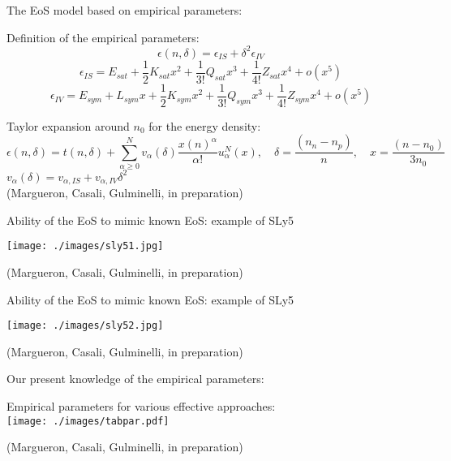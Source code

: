 \documentclass[francais]{beamer}
\begin{document}
\begin{frame}{The EoS model based on empirical parameters:} 
	\begin{block}{Definition of the empirical parameters:}
	\begin{equation}
\epsilon(n,\delta)=\epsilon_{IS}+\delta^2 \epsilon_{IV}
	\end{equation}
	\begin{equation}
	\epsilon_{IS} = E_{sat}+\dfrac{1}{2}K_{sat}x^2 + \dfrac{1}{3!}Q_{sat}x^3+\dfrac{1}{4!}Z_{sat}x^4+o(x^5)
	\end{equation}
	\begin{equation}
	\epsilon_{IV} = E_{sym}+L_{sym}x + \dfrac{1}{2}K_{sym}x^2 + \dfrac{1}{3!}Q_{sym}x^3+\dfrac{1}{4!}Z_{sym}x^4+o(x^5)
	\end{equation}
	\end{block}
	
	\begin{block}{Taylor expansion around $n_0$ for the energy density:}
	\vspace{-0.3cm}
			$$\epsilon(n,\delta)=t(n,											\delta)+\sum^{N}_{\alpha\geq0}v_{\alpha}								(\delta)\frac{x(n)^{\alpha}}{\alpha!}u^N_{\alpha}(x) ,
			 \quad \delta  = \dfrac{(n_n-n_p)}{n},\quad x=\dfrac{(n-n_0)}{3n_0}$$
$v_\alpha(\delta) = v_{\alpha,IS} + v_{\alpha,IV}\delta^2$\\
{\scriptsize (Margueron, Casali, Gulminelli, in preparation)}
	\end{block}
\end{frame}	
	

\begin{frame}{Ability of the EoS to mimic known EoS: example of SLy5}
\begin{center}
\texttt{[image: ./images/sly51.jpg]}
\end{center}
{\scriptsize (Margueron, Casali, Gulminelli, in preparation)}
\end{frame}

\begin{frame}{Ability of the EoS to mimic known EoS: example of SLy5}
\begin{center}
\texttt{[image: ./images/sly52.jpg]}
\end{center}
\vspace{-0.5cm}
{\scriptsize (Margueron, Casali, Gulminelli, in preparation)}
\end{frame}

\begin{frame}{Our present knowledge of the empirical parameters:}
\begin{center}
Empirical parameters for various effective approaches:\\
\texttt{[image: ./images/tabpar.pdf]}
\end{center}
\vspace{+0.3cm}
{\scriptsize (Margueron, Casali, Gulminelli, in preparation)}
\end{frame}
\end{document}
